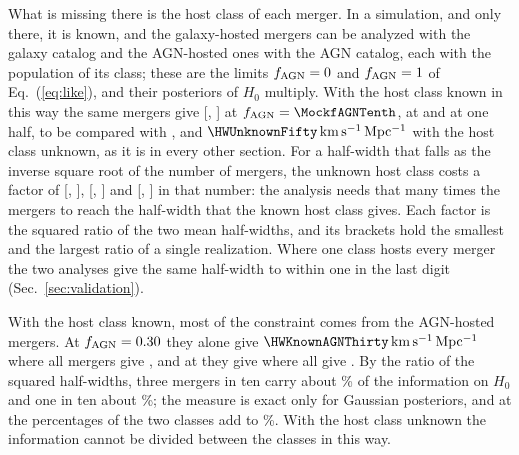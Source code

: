 \documentclass[aps,prd,reprint,twocolumn,superscriptaddress,nofootinbib,floatfix,nolongbibliography]{revtex4-2}
\newcommand{\kms}{{\rm km\,s^{-1}\,Mpc^{-1}}}
\newcommand{\fagn}{f_{\rm AGN}}
\begin{document}
What is missing there is the host class of each merger. In a simulation, and
only there, it is known, and the galaxy-hosted mergers can be analyzed with
the galaxy catalog and the AGN-hosted ones with the AGN catalog, each with the
population of its class; these are the limits $\fagn=0$ and $\fagn=1$ of
Eq.~(\ref{eq:like}), and their posteriors of $H_0$ multiply. With the host
class known in this way the same mergers give \HWKnownTen{}
[\HWKnownTenMin, \HWKnownTenMax] at $\fagn=\MockfAGNTenth$,
\HWKnownThirty{} at \MockfAGN{} and \HWKnownFifty{} at one half, to be
compared with \HWUnknownTen, \HWUnknownThirty{} and
$\HWUnknownFifty\,\kms$ with the host class unknown, as it is in every other
section. For a half-width that falls as the inverse square root of the
number of mergers, the unknown host class costs a factor of \CostUnknownTen{}
[\CostUnknownTenMin, \CostUnknownTenMax], \CostUnknownThirty{}
[\CostUnknownThirtyMin, \CostUnknownThirtyMax] and \CostUnknownFifty{}
[\CostUnknownFiftyMin, \CostUnknownFiftyMax] in that number: the analysis
needs that many times the mergers to reach the half-width that the known
host class gives. Each factor is the squared ratio of the two mean
half-widths, and its brackets hold the smallest and the largest ratio of a
single realization. Where one class hosts every merger the two analyses give
the same half-width to within one in the last digit
(Sec.~\ref{sec:validation}).

With the host class known, most of the constraint comes from the AGN-hosted
mergers. At $\fagn=\MockfAGN$ they alone give $\HWKnownAGNThirty\,\kms$
where all \MockNev{} mergers give \HWKnownThirty, and at \MockfAGNTenth{}
they give \HWKnownAGNTen{} where all give \HWKnownTen. By the ratio of the
squared half-widths, three mergers in ten carry about \ShareAGNThirty\% of
the information on $H_0$ and one in ten about \ShareAGNTen\%; the measure is
exact only for Gaussian posteriors, and at \MockfAGN{} the percentages of
the two classes add to \ShareSumThirty\%. With the host class unknown the
information cannot be divided between the classes in this way.
\end{document}
